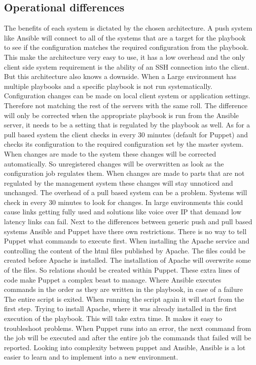 \subsection{Operational differences}
The benefits of each system is dictated by the chosen architecture. A push system like Ansible will connect to all of the systems that are a target for the playbook to see if the configuration matches the required configuration from the playbook. This make the architecture very easy to use, it has a low overhead and the only client side system requirement is the ability of an SSH connection into the client. But this architecture also knows a downside. When a Large environment has multiple playbooks and a specific playbook is not run systematically. Configuration changes can be made on local client system or application settings. Therefore not matching the rest of the servers with the same roll. The difference will only be corrected when the appropriate playbook is run from the Ansible server, it needs to be a setting that is regulated by the playbook as well. As for a pull based system the client checks in every 30 minutes (default for Puppet) and checks its configuration to the required configuration set by the master system. When changes are made to the system these changes will be corrected automatically. So unregistered changes will be overwritten as look as the configuration job regulates them. When changes are made to parts that are not regulated by the management system these changes will stay unnoticed and unchanged. The overhead of a pull based system can be a problem. Systems will check in every 30 minutes to look for changes. In large environments this could cause links getting fully used and solutions like voice over IP that demand low latency links can fail. Next to the differences between generic push and pull based systems Ansible and Puppet have there own restrictions. There is no way to tell Puppet what commands to execute first. When installing the Apache service and controlling the content of the html files published by Apache. The files could be created before Apache is installed. The installation of Apache will overwrite some of the files. So relations should be created within Puppet. These extra lines of code make Puppet a complex beast to manage. Where Ansible executes commands in the order as they are written in the playbook, in case of a failure The entire script is exited. When running the script again it will start from the first step. Trying to install Apache, where it was already installed in the first execution of the playbook. This will take extra time. It makes it easy to troubleshoot problems. When Puppet runs into an error, the next command from the job will be executed and after the entire job the commands that failed will be reported. Looking into complexity between puppet and Ansible, Ansible is a lot easier to learn and to implement into a new environment.

